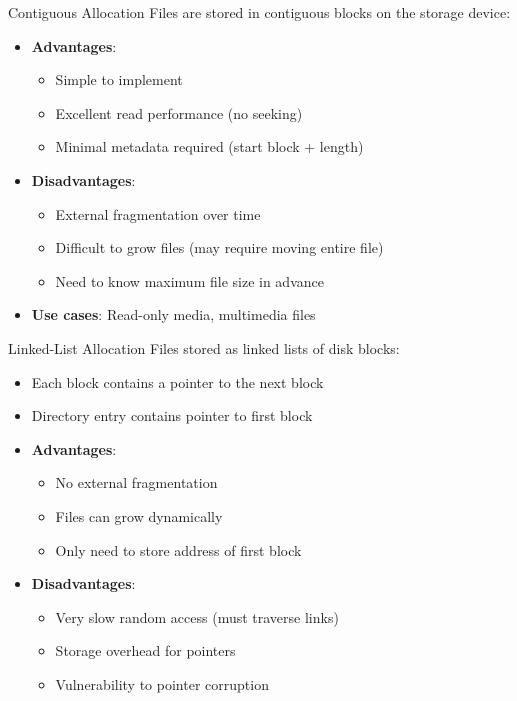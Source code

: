 \begin{concept}{Contiguous Allocation}
    Files are stored in contiguous blocks on the storage device:
    \begin{itemize}
        \item \textbf{Advantages}:
            \begin{itemize}
                \item Simple to implement
                \item Excellent read performance (no seeking)
                \item Minimal metadata required (start block + length)
            \end{itemize}
        \item \textbf{Disadvantages}:
            \begin{itemize}
                \item External fragmentation over time
                \item Difficult to grow files (may require moving entire file)
                \item Need to know maximum file size in advance
            \end{itemize}
        \item \textbf{Use cases}: Read-only media, multimedia files
    \end{itemize}
\end{concept}

\begin{concept}{Linked-List Allocation}
    Files stored as linked lists of disk blocks:
    \begin{itemize}
        \item Each block contains a pointer to the next block
        \item Directory entry contains pointer to first block
        \item \textbf{Advantages}:
            \begin{itemize}
                \item No external fragmentation
                \item Files can grow dynamically
                \item Only need to store address of first block
            \end{itemize}
        \item \textbf{Disadvantages}:
            \begin{itemize}
                \item Very slow random access (must traverse links)
                \item Storage overhead for pointers
                \item Vulnerability to pointer corruption
            \end{itemize}
    \end{itemize}
\end{concept}

